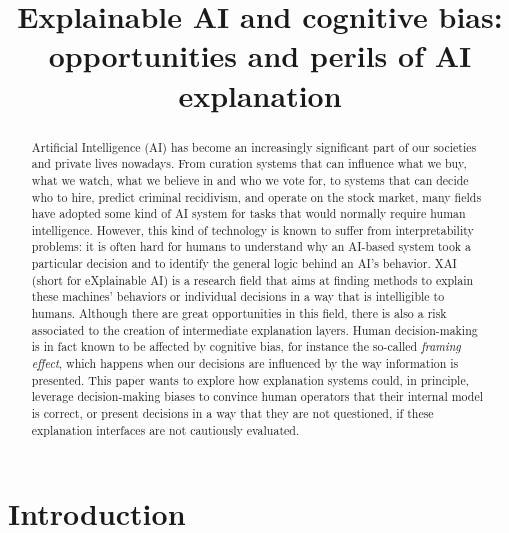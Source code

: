 \documentclass[conference]{IEEEtran}
\begin{document}
\title{Explainable AI and cognitive bias: opportunities and perils of AI explanation}


\author{
    }

\maketitle

\begin{abstract}
    Artificial Intelligence (AI) has become an increasingly significant part of
    our societies and private lives nowadays. From curation systems that can
    influence what we buy, what we watch, what we believe in and who we vote
    for, to systems that can decide who to hire, predict criminal recidivism,
    and operate on the stock market, many fields have adopted some kind of AI
    system for tasks that would normally require human intelligence. However,
    this kind of technology is known to suffer from interpretability problems:
    it is often hard for humans to understand why an AI-based system took a
    particular decision and to identify the general logic behind an AI's
    behavior. XAI (short for eXplainable AI) is a research field that aims at
    finding methods to explain these machines' behaviors or individual decisions
    in a way that is intelligible to humans. Although there are great
    opportunities in this field, there is also a risk associated to the creation
    of intermediate explanation layers. Human decision-making is in fact known
    to be affected by cognitive bias, for instance the so-called \textit{framing
        effect}, which happens when our decisions are influenced by the way
    information is presented. This paper wants to explore how explanation
    systems could, in principle, leverage decision-making biases to convince
    human operators that their internal model is correct, or present decisions
    in a way that they are not questioned, if these explanation interfaces are
    not cautiously evaluated.
\end{abstract}

\section{Introduction}
\label{sec:intro}
\end{document}
